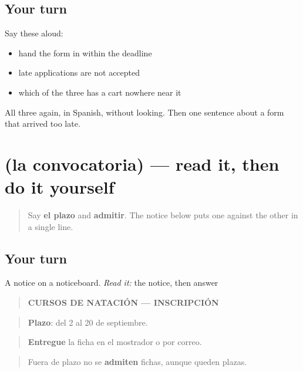 \subsection*{Your turn}
Say these aloud:

\begin{itemize}
\raggedright
  \item hand the form in within the deadline
  \item late applications are not accepted
  \item which of the three has a cart nowhere near it
\end{itemize}

\begin{tcolorbox}[breakable,colback=teal!4,colframe=teal!35!black,title={Before you move on}]
All three again, in Spanish, without looking. Then one sentence about a form that arrived too late.
\end{tcolorbox}
\section[Practice]{(la convocatoria) — read it, then do it yourself}

\label{lesson:ES-C458-sintesis-plazo}



\begin{quote}
Say \textbf{el plazo} and \textbf{admitir}. The notice below puts one against the other in a single line.
\end{quote}

\subsection*{Your turn}
A notice on a noticeboard. \emph{Read it:} the notice, then answer

\begin{quote}
\textbf{CURSOS DE NATACIÓN — INSCRIPCIÓN}
\end{quote}

\begin{quote}
\textbf{Plazo}: del 2 al 20 de septiembre.
\end{quote}

\begin{quote}
\textbf{Entregue} la ficha en el mostrador o por correo.
\end{quote}

\begin{quote}
Fuera de plazo no se \textbf{admiten} fichas, aunque queden plazas.
\end{quote}

